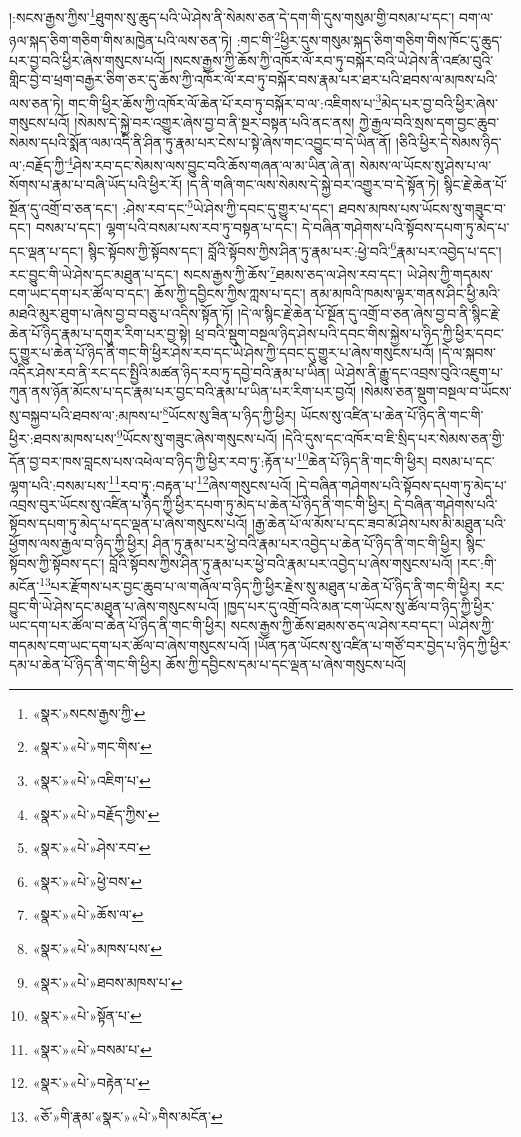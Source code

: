 །:སངས་རྒྱས་ཀྱིས་\footnote{«སྣར་»སངས་རྒྱས་ཀྱི་}ཐུགས་སུ་ཆུད་པའི་ཡེ་ཤེས་ནི་སེམས་ཅན་དེ་དག་གི་དུས་གསུམ་གྱི་བསམ་པ་དང་། བག་ལ་ཉལ་སྐད་ཅིག་གཅིག་གིས་མཁྱེན་པའི་ལས་ཅན་ཏེ། :གང་གི་\footnote{«སྣར་»«པེ་»གང་གིས་}ཕྱིར་དུས་གསུམ་སྐད་ཅིག་གཅིག་གིས་ཁོང་དུ་ཆུད་པར་བྱ་བའི་ཕྱིར་ཞེས་གསུངས་པའོ། །སངས་རྒྱས་ཀྱི་ཆོས་ཀྱི་འཁོར་ལོ་རབ་ཏུ་བསྐོར་བའི་ཡེ་ཤེས་ནི་འཛམ་བུའི་གླིང་བྱེ་བ་ཕྲག་བརྒྱར་ཅིག་ཅར་དུ་ཆོས་ཀྱི་འཁོར་ལོ་རབ་ཏུ་བསྐོར་བས་རྣམ་པར་ཐར་པའི་ཐབས་ལ་མཁས་པའི་ལས་ཅན་ཏེ། གང་གི་ཕྱིར་ཆོས་ཀྱི་འཁོར་ལོ་ཆེན་པོ་རབ་ཏུ་བསྐོར་བ་ལ་:འཇིགས་པ་\footnote{«སྣར་»«པེ་»འཇིག་པ་}མེད་པར་བྱ་བའི་ཕྱིར་ཞེས་གསུངས་པའོ། །སེམས་དེ་སྐྱེ་བར་འགྱུར་ཞེས་བྱ་བ་ནི་སྔར་བསྟན་པའི་ནང་ནས། ཀྱེ་རྒྱལ་བའི་སྲས་དག་བྱང་ཆུབ་སེམས་དཔའི་སྨོན་ལམ་འདི་ནི་ཤིན་ཏུ་རྣམ་པར་ངེས་པ་སྟེ་ཞེས་གང་འབྱུང་བ་དེ་ཡིན་ནོ། །ཅིའི་ཕྱིར་དེ་སེམས་ཉིད་ལ་:བརྗོད་ཀྱི་\footnote{«སྣར་»«པེ་»བརྗོད་ཀྱིས་}ཤེས་རབ་དང་སེམས་ལས་བྱུང་བའི་ཆོས་གཞན་ལ་མ་ཡིན་ཞེ་ན། སེམས་ལ་ཡོངས་སུ་ཤེས་པ་ལ་སོགས་པ་རྣམ་པ་བཞི་ཡོད་པའི་ཕྱིར་རོ། །ད་ནི་གཞི་གང་ལས་སེམས་དེ་སྐྱེ་བར་འགྱུར་བ་དེ་སྟོན་ཏེ། སྙིང་རྗེ་ཆེན་པོ་སྔོན་དུ་འགྲོ་བ་ཅན་དང་། :ཤེས་རབ་དང་\footnote{«སྣར་»«པེ་»ཤེས་རབ་}ཡེ་ཤེས་ཀྱི་དབང་དུ་གྱུར་པ་དང་། ཐབས་མཁས་པས་ཡོངས་སུ་གཟུང་བ་དང་། བསམ་པ་དང་། ལྷག་པའི་བསམ་པས་རབ་ཏུ་བསྟན་པ་དང་། དེ་བཞིན་གཤེགས་པའི་སྟོབས་དཔག་ཏུ་མེད་པ་དང་ལྡན་པ་དང་། སྙིང་སྟོབས་ཀྱི་སྟོབས་དང་། བློའི་སྟོབས་ཀྱིས་ཤིན་ཏུ་རྣམ་པར་:ཕྱེ་བའི་\footnote{«སྣར་»«པེ་»ཕྱེ་བས་}རྣམ་པར་འབྱེད་པ་དང་། རང་བྱུང་གི་ཡེ་ཤེས་དང་མཐུན་པ་དང་། སངས་རྒྱས་ཀྱི་ཆོས་\footnote{«སྣར་»«པེ་»ཆོས་ལ་}ཐམས་ཅད་ལ་ཤེས་རབ་དང་། ཡེ་ཤེས་ཀྱི་གདམས་ངག་ཡང་དག་པར་ཚོལ་བ་དང་། ཆོས་ཀྱི་དབྱིངས་ཀྱིས་ཀླས་པ་དང་། ནམ་མཁའི་ཁམས་ལྟར་གནས་ཤིང་ཕྱི་མའི་མཐའི་མུར་ཐུག་པ་ཞེས་བྱ་བ་བཅུ་པ་འདིས་སྟོན་ཏོ། །དེ་ལ་སྙིང་རྗེ་ཆེན་པོ་སྔོན་དུ་འགྲོ་བ་ཅན་ཞེས་བྱ་བ་ནི་སྙིང་རྗེ་ཆེན་པོ་ཉིད་རྣམ་པ་དགུར་རིག་པར་བྱ་སྟེ། ཕྲ་བའི་སྡུག་བསྔལ་ཉིད་ཤེས་པའི་དབང་གིས་སྐྱེས་པ་ཉིད་ཀྱི་ཕྱིར་དབང་དུ་གྱུར་པ་ཆེན་པོ་ཉིད་ནི་གང་གི་ཕྱིར་ཤེས་རབ་དང་ཡེ་ཤེས་ཀྱི་དབང་དུ་གྱུར་པ་ཞེས་གསུངས་པའོ། །དེ་ལ་སྐབས་འདིར་ཤེས་རབ་ནི་རང་དང་སྤྱིའི་མཚན་ཉིད་རབ་ཏུ་དབྱེ་བའི་རྣམ་པ་ཡིན། ཡེ་ཤེས་ནི་རྒྱུ་དང་འབྲས་བུའི་འཇུག་པ་ཀུན་ནས་ཉོན་མོངས་པ་དང་རྣམ་པར་བྱང་བའི་རྣམ་པ་ཡིན་པར་རིག་པར་བྱའོ། །སེམས་ཅན་སྡུག་བསྔལ་བ་ཡོངས་སུ་བསྐྱབ་པའི་ཐབས་ལ་:མཁས་པ་\footnote{«སྣར་»«པེ་»མཁས་པས་}ཡོངས་སུ་ཟིན་པ་ཉིད་ཀྱི་ཕྱིར། ཡོངས་སུ་འཛིན་པ་ཆེན་པོ་ཉིད་ནི་གང་གི་ཕྱིར་:ཐབས་མཁས་པས་\footnote{«སྣར་»«པེ་»ཐབས་མཁས་པ་}ཡོངས་སུ་གཟུང་ཞེས་གསུངས་པའོ། །དེའི་དུས་དང་འཁོར་བ་ཇི་སྲིད་པར་སེམས་ཅན་གྱི་དོན་བྱ་བར་ཁས་བླངས་པས་འཕེལ་བ་ཉིད་ཀྱི་ཕྱིར་རབ་ཏུ་:རྟོན་པ་\footnote{«སྣར་»«པེ་»སྟོན་པ་}ཆེན་པོ་ཉིད་ནི་གང་གི་ཕྱིར། བསམ་པ་དང་ལྷག་པའི་:བསམ་པས་\footnote{«སྣར་»«པེ་»བསམ་པ་}རབ་ཏུ་:བརྟན་པ་\footnote{«སྣར་»«པེ་»བརྟེན་པ་}ཞེས་གསུངས་པའོ། །དེ་བཞིན་གཤེགས་པའི་སྟོབས་དཔག་ཏུ་མེད་པ་འབྲས་བུར་ཡོངས་སུ་འཛིན་པ་ཉིད་ཀྱི་ཕྱིར་དཔག་ཏུ་མེད་པ་ཆེན་པོ་ཉིད་ནི་གང་གི་ཕྱིར། དེ་བཞིན་གཤེགས་པའི་སྟོབས་དཔག་ཏུ་མེད་པ་དང་ལྡན་པ་ཞེས་གསུངས་པའོ། །རྒྱ་ཆེན་པོ་ལ་མོས་པ་དང་ཟབ་མོ་ཤེས་པས་མི་མཐུན་པའི་ཕྱོགས་ལས་རྒྱལ་བ་ཉིད་ཀྱི་ཕྱིར། ཤིན་ཏུ་རྣམ་པར་ཕྱེ་བའི་རྣམ་པར་འབྱེད་པ་ཆེན་པོ་ཉིད་ནི་གང་གི་ཕྱིར། སྙིང་སྟོབས་ཀྱི་སྟོབས་དང་། བློའི་སྟོབས་ཀྱིས་ཤིན་ཏུ་རྣམ་པར་ཕྱེ་བའི་རྣམ་པར་འབྱེད་པ་ཞེས་གསུངས་པའོ། །རང་:གི་མངོན་\footnote{«ཅོ་»གི་རྣམ་«སྣར་»«པེ་»གིས་མངོན་}པར་རྫོགས་པར་བྱང་ཆུབ་པ་ལ་གཞོལ་བ་ཉིད་ཀྱི་ཕྱིར་རྗེས་སུ་མཐུན་པ་ཆེན་པོ་ཉིད་ནི་གང་གི་ཕྱིར། རང་བྱུང་གི་ཡེ་ཤེས་དང་མཐུན་པ་ཞེས་གསུངས་པའོ། །ཁྱད་པར་དུ་འགྲོ་བའི་མན་ངག་ཡོངས་སུ་ཚོལ་བ་ཉིད་ཀྱི་ཕྱིར་ཡང་དག་པར་ཚོལ་བ་ཆེན་པོ་ཉིད་ནི་གང་གི་ཕྱིར། སངས་རྒྱས་ཀྱི་ཆོས་ཐམས་ཅད་ལ་ཤེས་རབ་དང་། ཡེ་ཤེས་ཀྱི་གདམས་ངག་ཡང་དག་པར་ཚོལ་བ་ཞེས་གསུངས་པའོ། །ཡོན་ཏན་ཡོངས་སུ་འཛིན་པ་གཙོ་བར་བྱེད་པ་ཉིད་ཀྱི་ཕྱིར་དམ་པ་ཆེན་པོ་ཉིད་ནི་གང་གི་ཕྱིར། ཆོས་ཀྱི་དབྱིངས་དམ་པ་དང་ལྡན་པ་ཞེས་གསུངས་པའོ། 